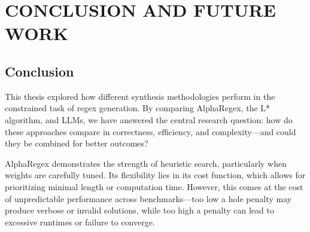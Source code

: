 %
%
%






\chapter{CONCLUSION AND FUTURE WORK}

\section{Conclusion}

\indent\indent This thesis explored how different synthesis methodologies perform in the constrained task of regex generation. By comparing AlphaRegex, the L* algorithm, and LLMs, we have answered the central research question: how do these approaches compare in correctness, efficiency, and complexity—and could they be combined for better outcomes?

\indent\indent AlphaRegex demonstrates the strength of heuristic search, particularly when weights are carefully tuned. Its flexibility lies in its cost function, which allows for prioritizing minimal length or computation time. However, this comes at the cost of unpredictable performance across benchmarks—too low a hole penalty may produce verbose or invalid solutions, while too high a penalty can lead to excessive runtimes or failure to converge.

